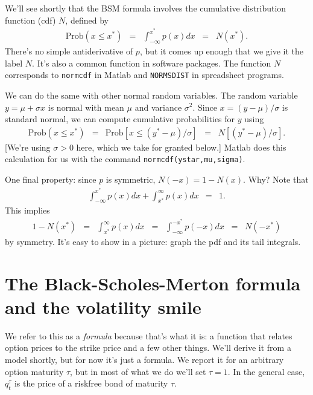 \documentclass[11pt]{article}
\begin{document}
We'll see shortly that the BSM formula
involves the cumulative distribution function (cdf) $N$,
defined by
\begin{eqnarray*}
    \mbox{Prob} (x \leq x^*)  &=& \int_{-\infty}^{x^*} p(x) dx
        \;\;=\;\; N(x^*).
\end{eqnarray*}
There's no simple antiderivative of $p$, but it comes up enough that
we give it the label $N$.
It's also a common function in software packages.
The function $N$ corresponds to {\tt normcdf} in Matlab
and {\tt NORMSDIST} in spreadsheet programs.

We can do the same with other normal random variables.
The random variable $ y = \mu + \sigma x$
is normal with mean $\mu$ and variance $\sigma^2$.
Since $ x = (y-\mu)/\sigma$ is standard normal,
we can compute cumulative probabilities for $y$ using
\begin{eqnarray*}
    \mbox{Prob} (x \leq x^*)  &=& \mbox{Prob} [x \leq (y^*-\mu)/\sigma ]
        \;\;=\;\; N\left[ (y^*-\mu)/\sigma \right].
\end{eqnarray*}
[We're using $\sigma > 0$ here, which we take for granted below.]
Matlab does this calculation for us with the command {\tt normcdf(ystar,mu,sigma)}.

One final property:  since $p$ is symmetric, $N(-x) = 1 - N(x)$.
Why?
Note that
\begin{eqnarray*}
\int_{-\infty}^{x^*} p(x) dx + \int_{x^*}^{\infty} p(x) dx &=& 1 .
\end{eqnarray*}
This implies
\begin{eqnarray*}
     1 - N(x^*) &=& \int_{x^*}^{\infty} p(x) dx \;\;=\;\; \int_{-\infty}^{-x^*} p(-x) dx
            \;\;=\;\; N(-x^*)
\end{eqnarray*}
by symmetry.
It's easy to show in a picture:
graph the pdf and its tail integrals.


\section{The Black-Scholes-Merton formula and the volatility smile}


We refer to this as a {\it formula\/} because that's what it is:
a function that relates option prices to the strike price
and a few other things.  We'll derive it from a model shortly,
but for now it's just a formula.
We report it for an arbitrary option maturity $\tau$,
but in most of what we do we'll set $\tau = 1$.
In the general case, $q^\tau_t$ is the price of a riskfree bond
of maturity $\tau$.
\end{document}
